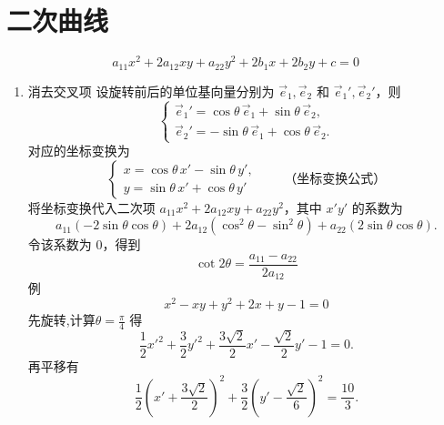 \documentclass[UTF8,11pt]{ctexart}
\theoremstyle{cnthm}
\begin{document}
\section{二次曲线}

\[
a_{11}x^2+2a_{12}xy+a_{22}y^2+2b_1x+2b_2y+c=0
\]
\begin{enumerate}
\item 消去交叉项
设旋转前后的单位基向量分别为
$\vec e_1,\vec e_2$ 和 $\vec e_1',\vec e_2'$，则
\[
\left\{
\begin{array}{l}
\vec e_1'=\cos\theta\,\vec e_1+\sin\theta\,\vec e_2,\\
\vec e_2'=-\sin\theta\,\vec e_1+\cos\theta\,\vec e_2.
\end{array}
\right.
\]
对应的坐标变换为
\[
\left\{
\begin{array}{l}
x=\cos\theta\,x'-\sin\theta\,y',\\
y=\sin\theta\,x'+\cos\theta\,y'
\end{array}
\right.
\qquad\text{（坐标变换公式）}
\]
将坐标变换代入二次项
$a_{11}x^2+2a_{12}xy+a_{22}y^2$，其中 $x'y'$ 的系数为
\[
a_{11}(-2\sin\theta\cos\theta)
{}+2a_{12}(\cos^2\theta-\sin^2\theta)
{}+a_{22}(2\sin\theta\cos\theta).
\]
令该系数为 $0$，得到
\[
\cot{2 \theta} = \frac{a_{11} - a_{22}}{2a_{12}}
\]
例
\[
x^2-xy+y^2+2x+y-1 = 0
\]
先旋转,计算$\theta = \frac {\pi}{4}$
得
\[
\frac{1}{2}x'^2+\frac{3}{2}y'^2
+\frac{3\sqrt{2}}{2}x'
-\frac{\sqrt{2}}{2}y'-1=0.
\]
再平移有
\[
\frac{1}{2}\left(x'+\frac{3\sqrt{2}}{2}\right)^2
+\frac{3}{2}\left(y'-\frac{\sqrt{2}}{6}\right)^2
=\frac{10}{3}.
\]

\end{enumerate}
\end{document}
